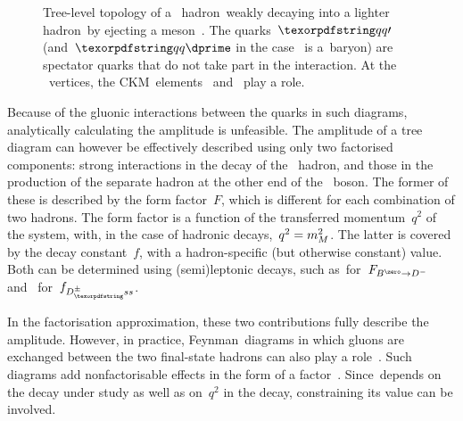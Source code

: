 \begin{figure}[hb]
    \caption{
        Tree-level topology of a \bquark~hadron~\PB weakly decaying into a lighter hadron~\PH by ejecting a meson~\PM.
        The quarks~\({\quark\prime}\) (and~\({\quark\dprime}\) in the case \PB~is a~baryon) are spectator quarks that do not take part in the interaction.
        At the \Wpm~vertices, the CKM~elements~\V{\quark\bquark} and~ play a role.}
    \label{fig:theory_Topologies_Tree}
\end{figure}

Because of the gluonic interactions between the quarks in such diagrams, analytically calculating the amplitude is unfeasible.
The amplitude of a tree diagram can however be effectively described using only two factorised components: strong interactions in the decay of the \bquark~hadron, and those in the production of the separate hadron at the other end of the \Wpm~boson.
The former of these is described by the form factor~\(F\), which is different for each combination of two hadrons.
The form factor is a function of the transferred momentum~\(q^{2}\) of the system, with, in the case of hadronic decays,~\({q^{2} = m_{M}^{2}}\).
The latter is covered by the decay constant~\(f\), with a hadron-specific (but otherwise constant) value.
Both can be determined using (semi)leptonic decays, such as~\BdDmunu for~\(F_{\decay{\Bd}{\Dm}}\) and~\decay{\Dsp}{\mup\neum} for~\(f_{\Dspm}\).

In the factorisation approximation, these two contributions fully describe the amplitude.
However, in practice, Feynman~diagrams in which gluons are exchanged between the two final-state hadrons can also play a role~\cite{Beneke:2000ry}.
Such diagrams add nonfactorisable effects in the form of a factor~\aNF.
Since~\aNF depends on the decay under study as well as on~\(q^{2}\) in the decay, constraining its value can be involved.

